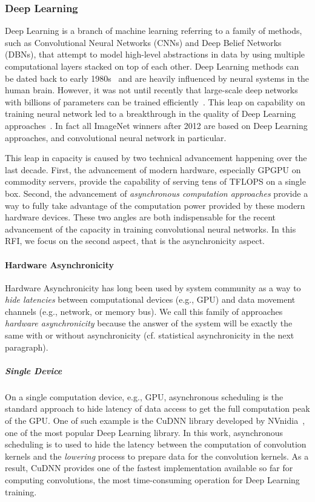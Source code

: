 \documentclass[12pt]{report}
\begin{document}
\subsubsection{Deep Learning}
Deep Learning is a branch of machine learning referring to a family of methods, such as Convolutional Neural Networks (CNNs) and Deep Belief Networks (DBNs), that attempt to model high-level abstractions in data by using multiple computational layers stacked on top of each other. Deep Learning methods can be dated back to early 1980s~\cite{Kunihiko:1980:Book}
and are heavily influenced by neural systems in the human brain. However, it was not until
recently that large-scale deep networks with billions of parameters can be trained efficiently~\cite{Dean:2012:NIPS,Krizhevsky:2012:NIPS}. This leap on capability
on training neural network led to a breakthrough in the quality of Deep Learning approaches~\cite{2014arXiv1409.1556S,Krizhevsky:2012:NIPS,2014arXiv1409.4842S}. In fact all ImageNet winners after 2012 are based on Deep Learning approaches, and convolutional neural network in particular.

This leap in capacity is caused by two technical advancement happening over the last decade.
First, the advancement of modern hardware, especially GPGPU on commodity servers, provide the capability of serving tens of TFLOPS on a single box. Second, the advancement of {\em asynchronous computation approaches} provide a way to fully take advantage of the computation power provided by these modern hardware devices. These two angles are both
indispensable for the recent advancement of the capacity in training convolutional neural networks. In this RFI, we focus on the second aspect, that is the asynchronicity aspect.

\paragraph*{Hardware Asynchronicity} Hardware Asynchronicity has long been used by
system community as a way to {\em hide latencies} between
computational devices (e.g., GPU) and data movement channels (e.g., network, or 
memory bus). We call this family of approaches {\em hardware asynchronicity}
because the answer of the system will be exactly the same with or without asynchronicity
(cf. statistical asynchronicity in the next paragraph).

\subparagraph*{Single Device} On a single computation device, e.g., GPU, asynchronous scheduling is the standard approach to hide latency of data access to get the full
computation peak of the GPU. One of such example is the CuDNN library developed
by NVnidia~\cite{cudnn}, one of the most popular Deep Learning library. In this work,
asynchronous scheduling is to used to hide the latency between the computation of
convolution kernels and the {\em lowering} process to prepare data for the convolution kernels. As a result, CuDNN provides one of the fastest implementation available so far
for computing convolutions, the most time-consuming operation for Deep Learning training.
\end{document}

